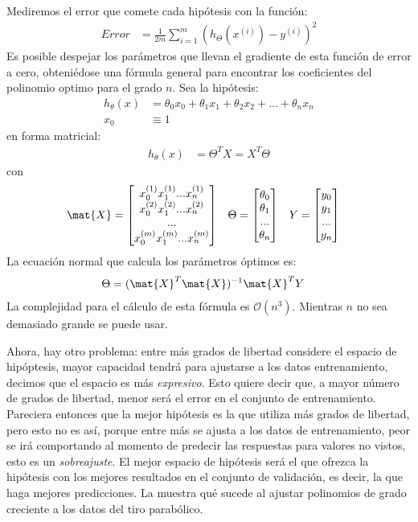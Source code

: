 Mediremos el error que comete cada hipótesis con la función:
\begin{align*}
Error &= \frac{1}{2m} \sum_{i=1}^{m} (h_{\Theta}(x^{(i)})-y^{(i)})^2
\end{align*}
Es posible despejar los parámetros que llevan el gradiente de esta función de error a cero, obteniédose una fórmula general para encontrar los coeficientes del polinomio optimo para el grado $n$.  Sea la hipótesis:
\begin{align*}
 h_\theta(x) &= \theta_0 x_0 + \theta_1 x_1 + \theta_2 x_2 + ... + \theta_n x_n \\
 x_0 &\equiv 1
\end{align*}
en forma matricial:
\begin{align*}
 h_\theta(x) &= \Theta^T X = X^T \Theta
\end{align*}
con
\begin{align}
\mat{X} &= \begin{bmatrix}
       x_0^{(1)} x_1^{(1)} ... x_n^{(1)}  \\
       x_0^{(2)} x_1^{(2)} ... x_n^{(2)}  \\
       ...\\
       x_0^{(m)} x_1^{(m)} ... x_n^{(m)}
      \end{bmatrix} &
  \Theta &= \begin{bmatrix}
             \theta_0 \\
             \theta_1 \\
             ... \\
             \theta_n
            \end{bmatrix} &
  Y &= \begin{bmatrix}
       y_0 \\
       y_1\\
       ...\\
       y_n
      \end{bmatrix}
\end{align}
La ecuación normal que calcula los parámetros óptimos es:
\begin{align}
\Theta &= (\mat{X}^T \mat{X})^{-1} \mat{X}^T Y
\end{align}
La complejidad para el cálculo de esta fórmula es $\mathcal{O}(n^3)$.  Mientras $n$ no sea demasiado grande se puede usar.

Ahora, hay otro problema: entre más grados de libertad considere el espacio de hipóptesis, mayor capacidad tendrá para ajustarse a los datos entrenamiento, decimos que el espacio es más \textit{expresivo}.  Esto quiere decir que, a mayor número de grados de libertad, menor será el error en el conjunto de entrenamiento.  Pareciera entonces que la mejor hipótesis es la que utiliza más grados de libertad, pero esto no es así, porque entre más se ajusta a los datos de entrenamiento, peor se irá comportando al momento de predecir las respuestas para valores no vistos, esto es un \emph{sobreajuste}.  El mejor espacio de hipótesis será el que ofrezca la hipótesis con los mejores resultados en el conjunto de validación, es decir, la que haga mejores predicciones.  La  muestra qué sucede al ajustar polinomios de grado creciente a los datos del tiro parabólico.


